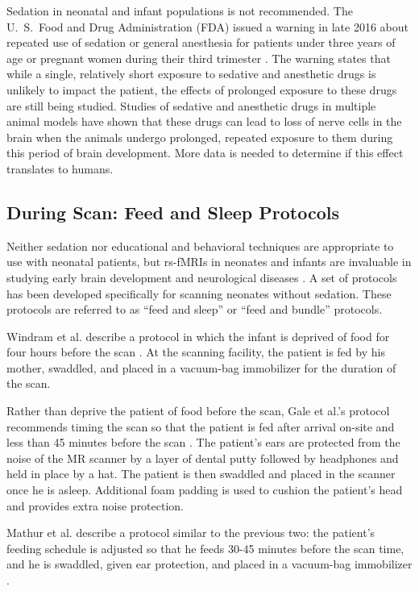 Sedation in neonatal and infant populations is not recommended. The  U.~S.~Food and Drug Administration (FDA) issued a warning in late 2016 about repeated use of sedation or general anesthesia for patients under three years of age or pregnant women during their third trimester \cite{FDA2016}. The warning states that while a single, relatively short exposure to sedative and anesthetic drugs is unlikely to impact the patient, the effects of prolonged exposure to these drugs are still being studied. Studies of sedative and anesthetic drugs in multiple animal models have shown that these drugs can lead to loss of nerve cells in the brain when the animals undergo prolonged, repeated exposure to them during this period of brain development. More data is needed to determine if this effect translates to humans.

\subsection{During Scan: Feed and Sleep Protocols}

Neither sedation nor educational and behavioral techniques are appropriate to use with neonatal patients, but rs-fMRIs in neonates and infants are invaluable in studying early brain development and neurological diseases \cite{Smyser2015}. A set of protocols has been developed specifically for scanning neonates without sedation. These protocols are referred to as ``feed and sleep'' or ``feed and bundle'' protocols.

Windram et al. describe a protocol in which the infant is deprived of food for four hours before the scan \cite{Windram2011}. At the scanning facility, the patient is fed by his mother, swaddled, and placed in a vacuum-bag immobilizer for the duration of the scan. 

Rather than deprive the patient of food before the scan, Gale et al.'s protocol recommends timing the scan so that the patient is fed after arrival on-site and less than 45 minutes before the scan \cite{Gale2013}. The patient's ears are protected from the noise of the MR scanner by a layer of dental putty followed by headphones and held in place by a hat. The patient is then swaddled and placed in the scanner once he is asleep. Additional foam padding is used to cushion the patient's head and provides extra noise protection.

Mathur et al. describe a protocol similar to the previous two: the patient's feeding schedule is adjusted so that he feeds 30-45 minutes before the scan time, and he is swaddled, given ear protection, and placed in a vacuum-bag immobilizer \cite{Mathur2008}.

